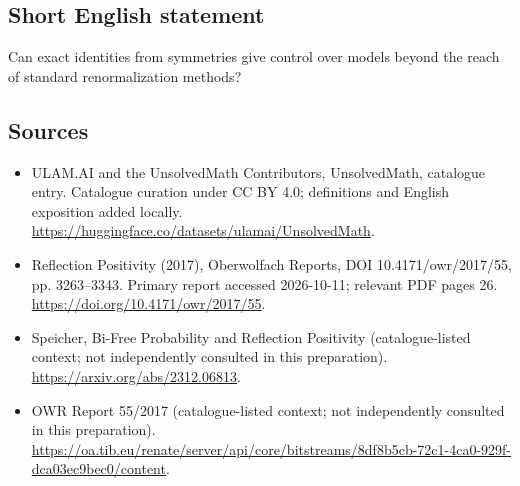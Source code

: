 \documentclass[11pt]{article}
\begin{document}
\subsection{Short English statement}
Can exact identities from symmetries give control over models beyond the reach of standard renormalization methods?
\subsection{Sources}
\begin{itemize}
\item[\hypertarget{source:statement:1}{S1}] ULAM.AI and the UnsolvedMath Contributors, UnsolvedMath, catalogue entry. Catalogue curation under CC BY 4.0; definitions and English exposition added locally.
\url{https://huggingface.co/datasets/ulamai/UnsolvedMath}.
\item[\hypertarget{source:statement:2}{S2}] Reflection Positivity (2017), Oberwolfach Reports, DOI 10.4171/owr/2017/55, pp. 3263--3343. Primary report accessed 2026-10-11; relevant PDF pages 26.
\url{https://doi.org/10.4171/owr/2017/55}.
\item[\hypertarget{source:statement:3}{S3}] Speicher, Bi-Free Probability and Reflection Positivity (catalogue-listed context; not independently consulted in this preparation).
\url{https://arxiv.org/abs/2312.06813}.
\item[\hypertarget{source:statement:4}{S4}] OWR Report 55/2017 (catalogue-listed context; not independently consulted in this preparation).
\url{https://oa.tib.eu/renate/server/api/core/bitstreams/8df8b5cb-72c1-4ca0-929f-dca03ec9bec0/content}.
\end{itemize}
\label{end:statement}
\end{document}
